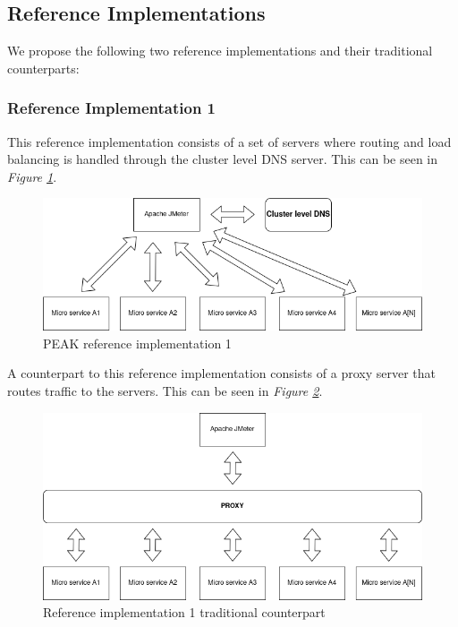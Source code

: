 \documentclass[12pt]{article}
\begin{document}
\subsection{Reference Implementations}
We propose the following two reference implementations and their traditional counterparts:

\subsubsection{Reference Implementation 1}
This reference implementation consists of a set of servers where routing and load balancing is handled through the cluster level DNS server.
This can be seen in \textit{Figure \ref{fig:test-one}}.

\begin{figure}[H]
    \centering
    \includegraphics[width=\textwidth]{test-one.drawio.png}
    \caption{PEAK reference implementation 1}
    \label{fig:test-one}
\end{figure}

A counterpart to this reference implementation consists of a proxy server that routes traffic to the servers. This can be seen in \textit{Figure \ref{fig:test-one-traditional}}.

\begin{figure}[H]
    \centering
    \includegraphics[width=\textwidth]{test-one-traditional.drawio.png}
    \caption{Reference implementation 1 traditional counterpart}
    \label{fig:test-one-traditional}
\end{figure}
\end{document}
